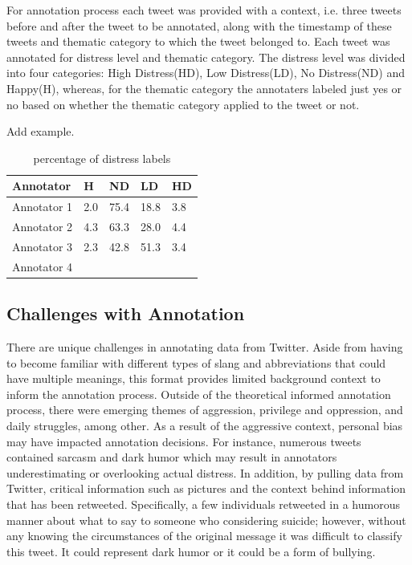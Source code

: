 \documentclass[11pt]{article}
\begin{document}
For annotation process each tweet was provided with a context, i.e. three tweets before and after the tweet to be annotated, along with the timestamp of these tweets and thematic category to which the tweet belonged to. Each tweet was annotated for distress level and thematic category. The distress level was divided into four categories: High Distress(HD), Low Distress(LD), No Distress(ND) and Happy(H), whereas, for the thematic category the annotaters labeled just yes or no based on whether the thematic category applied to the tweet or not.

Add example.

\begin{table}
    \centering
    \begin{tabular}{|l|l|l|l|l|}
    \hline
    Annotator    & H   & ND   & LD   & HD  \\ \hline
    Annotator 1  & 2.0 & 75.4 & 18.8 & 3.8 \\ \hline
    Annotator 2  & 4.3 & 63.3 & 28.0 & 4.4 \\ \hline
    Annotator 3  & 2.3 & 42.8 & 51.3 & 3.4 \\ \hline
    Annotator 4  & ~   & ~    & ~    & ~   \\ \hline
    \end{tabular}
    \caption {percentage of distress labels }

\label{tab:percentage}
\end{table}

\subsection{Challenges with Annotation}

There are unique challenges in annotating data from Twitter.  Aside from having to become familiar with different types of slang and abbreviations that could have multiple meanings, this format provides limited background context to inform the annotation process.  Outside of the theoretical informed annotation process, there were emerging themes of aggression, privilege and oppression, and daily struggles, among other.  As a result of the aggressive context, personal bias may have impacted annotation decisions. For instance, numerous tweets contained sarcasm and dark humor which may result in annotators underestimating or overlooking actual distress. In addition, by pulling data from Twitter, critical information such as pictures and the context behind information that has been retweeted.  Specifically, a few individuals retweeted in a humorous manner about what to say to someone who considering suicide; however, without any knowing the circumstances of the original message it was difficult to classify this tweet.  It could represent dark humor or it could be a form of bullying.
\end{document}
